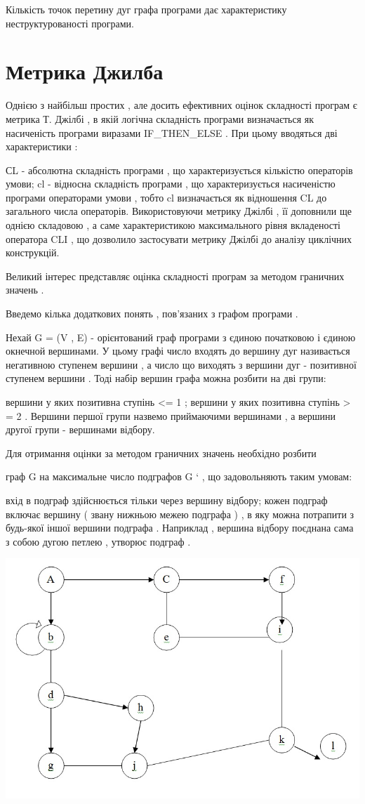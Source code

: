 \documentclass[oneside,final,14pt]{extreport}
\begin{document}
Кількість точок перетину дуг графа програми дає характеристику неструктурованості програми.


\section{Метрика Джилба}
\label{2section:id12}
Однією з найбільш простих , але досить ефективних оцінок складності програм є метрика Т. Джілбі , в якій логічна складність програми визначається як насиченість програми виразами IF\_THEN\_ELSE . При цьому вводяться дві характеристики :

СL - абсолютна складність програми , що характеризується кількістю операторів умови;
cl - відносна складність програми , що характеризується насиченістю програми операторами умови , тобто cl визначається як відношення CL до загального числа операторів.
Використовуючи метрику Джілбі , її доповнили ще однією складовою , а саме характеристикою максимального рівня вкладеності оператора CLI , що дозволило застосувати метрику Джілбі до аналізу циклічних конструкцій.

Великий інтерес представляє оцінка складності програм за методом граничних значень .

Введемо кілька додаткових понять , пов'язаних з графом програми .

Нехай G = (V , E) - орієнтований граф програми з єдиною початковою і єдиною окнечной вершинами. У цьому графі число входять до вершину дуг називається негативною ступенем вершини , а число що виходять з вершини дуг - позитивної ступенем вершини . Тоді набір вершин графа можна розбити на дві групи:

вершини у яких позитивна ступінь \textless{}= 1 ;
вершини у яких позитивна ступінь \textgreater{} = 2 .
Вершини першої групи назвемо приймаючими вершинами , а вершини другої групи - вершинами відбору.

Для отримання оцінки за методом граничних значень необхідно розбити

граф G на максимальне число подграфов G ` , що задовольняють таким умовам:

вхід в подграф здійснюється тільки через вершину відбору;
кожен подграф включає вершину ( звану нижньою межею подграфа ) , в яку можна потрапити з будь-якої іншої вершини подграфа . Наприклад , вершина відбору поєднана сама з собою дугою петлею , утворює подграф .

\includegraphics{metrics_Jilb_1.jpg}
\end{document}
